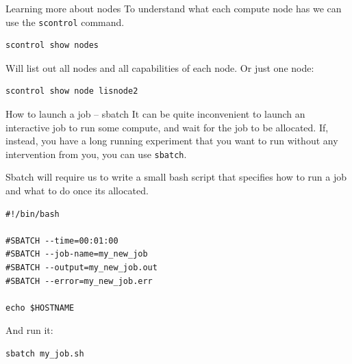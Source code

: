 \documentclass[10pt]{beamer}
\begin{document}
\begin{frame}[label={sec:orgb687f0c},fragile]{Learning more about nodes}
 To understand what each compute node has we can use the \texttt{scontrol} command.

\begin{verbatim}
scontrol show nodes
\end{verbatim}

Will list out all nodes and all capabilities of each node. Or just one node:

\begin{verbatim}
scontrol show node lisnode2
\end{verbatim}
\end{frame}

\begin{frame}[label={sec:org3c6a1bc},fragile]{How to launch a job -- sbatch}
 It can be quite inconvenient to launch an interactive job to run some compute,
and wait for the job to be allocated. If, instead, you have a long running
experiment that you want to run without any intervention from you, you can use
\texttt{sbatch}.

Sbatch will require us to write a small bash script that specifies how to run a
job and what to do once its allocated.

\begin{verbatim}
#!/bin/bash

#SBATCH --time=00:01:00
#SBATCH --job-name=my_new_job
#SBATCH --output=my_new_job.out
#SBATCH --error=my_new_job.err

echo $HOSTNAME
\end{verbatim}

And run it:

\begin{verbatim}
sbatch my_job.sh
\end{verbatim}
\end{frame}
\end{document}
